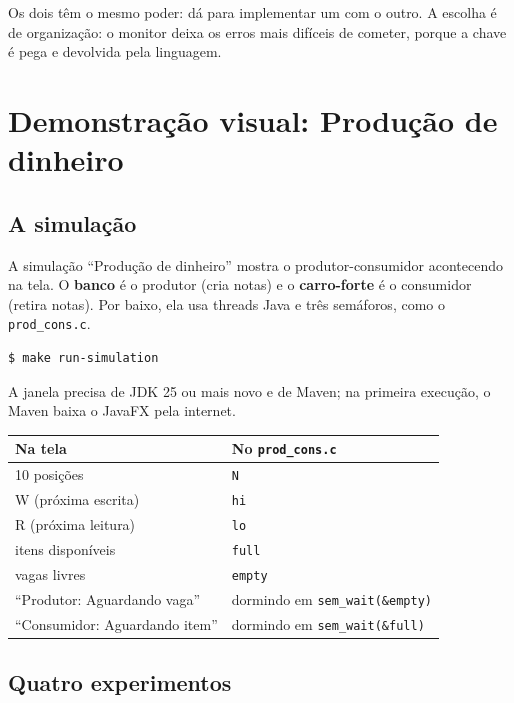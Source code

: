 \documentclass[11pt,a4paper]{article}
\newcommand{\cmd}[1]{\texttt{#1}}
\begin{document}
Os dois têm o mesmo poder: dá para implementar um com o outro. A escolha é de organização: o monitor deixa os erros mais difíceis de cometer, porque a chave é pega e devolvida pela linguagem.

\section{Demonstração visual: Produção de dinheiro}

\subsection{A simulação}

A simulação ``Produção de dinheiro'' mostra o produtor-consumidor acontecendo na tela. O \textbf{banco} é o produtor (cria notas) e o \textbf{carro-forte} é o consumidor (retira notas). Por baixo, ela usa threads Java e três semáforos, como o \cmd{prod\_cons.c}.

\begin{lstlisting}[style=terminal]
$ make run-simulation
\end{lstlisting}

A janela precisa de JDK 25 ou mais novo e de Maven; na primeira execução, o Maven baixa o JavaFX pela internet.

\begin{center}
\begin{tabular}{@{}ll@{}}
\toprule
\textbf{Na tela} & \textbf{No \cmd{prod\_cons.c}} \\
\midrule
10 posições & \cmd{N} \\
W (próxima escrita) & \cmd{hi} \\
R (próxima leitura) & \cmd{lo} \\
itens disponíveis & \cmd{full} \\
vagas livres & \cmd{empty} \\
``Produtor: Aguardando vaga'' & dormindo em \cmd{sem\_wait(\&empty)} \\
``Consumidor: Aguardando item'' & dormindo em \cmd{sem\_wait(\&full)} \\
\bottomrule
\end{tabular}
\end{center}

\subsection{Quatro experimentos}
\end{document}

